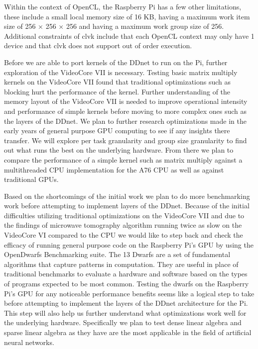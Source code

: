 \documentclass[conference]{IEEEtran}
\begin{document}
 Within the context of OpenCL, the Raspberry Pi has a few other limitations, these include a small local memory size of 
 16 KB, having a maximum work item size of 256 × 256 × 256 and having a maximum work group size of 256. Additional 
 constraints of clvk include that each OpenCL context may only have 1 device and that clvk does not support out of order 
 execution.

 Before we are able to port kernels of the DDnet to run on the Pi, further exploration of the VideoCore VII is 
 necessary. Testing basic matrix multiply kernels on the VideoCore VII found that traditional optimizations such 
 as blocking hurt the performance of the kernel. Further understanding of the memory layout of the VideoCore VII is
 needed to improve operational intensity and performance of simple kernels before moving to more complex ones such 
 as the layers of the DDnet. We plan to further research optimizations made in the early years of general purpose 
 GPU computing to see if any insights there transfer. We will explore per task granularity and group size granularity
 to find out what runs the best on the underlying hardware. From there we plan to compare the performance of a simple 
 kernel such as matrix multiply against a multithreaded CPU implementation for the A76 CPU as well as against traditional 
 GPUs.

 Based on the shortcomings of the initial work we plan to do more benchmarking work before attempting to implement layers 
 of the DDnet. Because of the initial difficulties utilizing traditional optimizations on the VideoCore VII and 
 due to the findings of microwave tomography algorithm running twice as slow on the VideoCore VI compared to the CPU \cite{vasileiou_accelerated_nodate}
 we would like to step back and check the efficacy of running general purpose code on the Raspberry Pi's GPU by 
 using the OpenDwarfs Benchmarking suite. The 13 Dwarfs are a 
 set of fundamental algorithms that capture patterns in computation\cite{asanovic_landscape_2006}. They are useful in place of traditional benchmarks 
 to evaluate a hardware and software based on the types of programs expected to be most common. Testing the dwarfs on
 the Raspberry Pi's GPU for any noticeable performance benefits seems like a logical step to take before attempting 
 to implement the layers of the DDnet architecture for the Pi. This step will also help us further understand 
 what optimizations work well for the underlying hardware. Specifically we plan to test dense linear algebra 
 and sparse linear algebra as they have are the most applicable in the field of artificial neural networks.
\end{document}
